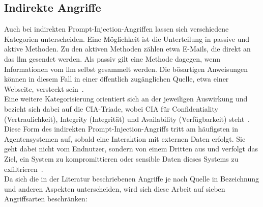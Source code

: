 \subsection{Indirekte Angriffe}\label{subsec:indirektepi}

Auch bei indirekten Prompt-Injection-Angriffen lassen sich verschiedene Kategorien unterscheiden. Eine Möglichkeit ist die Unterteilung in passive und aktive Methoden.
Zu den aktiven Methoden zählen etwa E-Mails, die direkt an das \ac{llm} gesendet werden. Als passiv gilt eine Methode dagegen, wenn Informationen vom \ac{llm} selbst gesammelt werden.
Die bösartigen Anweisungen können in diesem Fall in einer öffentlich zugänglichen Quelle, etwa einer Webseite, versteckt sein~\cite{pi19}. \\
Eine weitere Kategorisierung orientiert sich an der jeweiligen Auswirkung und bezieht sich dabei auf die CIA-Triade, wobei CIA für Confidentiality (Vertraulichkeit), 
Integrity (Integrität) und Availability (Verfügbarkeit) steht~\cite{pi23}. \\
Diese Form des indirekten Prompt-Injection-Angriffs tritt am häufigsten in Agentensystemen auf, sobald eine Interaktion mit externen Daten erfolgt. Sie geht dabei nicht
vom Endnutzer, sondern von einem Dritten aus und verfolgt das Ziel, ein System zu kompromittieren oder sensible Daten dieses Systems zu exfiltrieren~\cite[2\psq]{pi3}. \\
Da sich die in der Literatur beschriebenen Angriffe je nach Quelle in Bezeichnung und anderen Aspekten unterscheiden, wird sich diese Arbeit auf sieben Angriffsarten 
beschränken:


